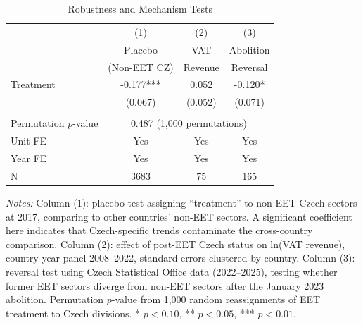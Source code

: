 \begin{table}[H]
\centering
\caption{Robustness and Mechanism Tests}
\begin{threeparttable}
\begin{tabular}{lccc}
\toprule
 & (1) & (2) & (3) \\
 & Placebo & VAT & Abolition \\
 & (Non-EET CZ) & Revenue & Reversal \\
\midrule
Treatment & -0.177*** & 0.052 & -0.120* \\
 & (0.067) & (0.052) & (0.071) \\
 & & & \\
Permutation $p$-value & \multicolumn{3}{c}{0.487 (1,000 permutations)} \\
Unit FE & Yes & Yes & Yes \\
Year FE & Yes & Yes & Yes \\
N & 3683 & 75 & 165 \\
\bottomrule
\end{tabular}
\begin{tablenotes}[flushleft]
\small
\item \textit{Notes:} Column (1): placebo test assigning ``treatment'' to non-EET Czech sectors at 2017, comparing to other countries' non-EET sectors. A significant coefficient here indicates that Czech-specific trends contaminate the cross-country comparison. Column (2): effect of post-EET Czech status on ln(VAT revenue), country-year panel 2008--2022, standard errors clustered by country. Column (3): reversal test using Czech Statistical Office data (2022--2025), testing whether former EET sectors diverge from non-EET sectors after the January 2023 abolition. Permutation $p$-value from 1,000 random reassignments of EET treatment to Czech divisions. * $p<0.10$, ** $p<0.05$, *** $p<0.01$.
\end{tablenotes}
\end{threeparttable}
\label{tab:robust}
\end{table}

